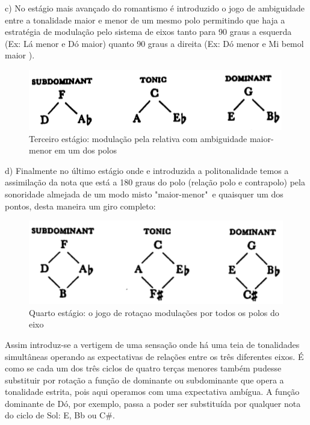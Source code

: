 \documentclass[
	12pt,				%
	openright,			%
	twoside,			%
	a4paper,			%
	english,			%
	french,				%
	spanish,			%
	brazil				%
	]{abntex2}
\begin{document}
c) No estágio mais avançado do romantismo é introduzido o jogo de ambiguidade entre a tonalidade maior e menor de um mesmo polo permitindo que haja a estratégia de modulação pelo sistema de eixos tanto para 90 graus a esquerda (Ex: Lá menor e Dó maior) quanto 90 graus a direita (Ex: Dó menor e Mi bemol maior ).

\begin{figure}[!h]
	\caption{\label{fig_grafico}Terceiro estágio: modulação pela relativa com ambiguidade maior-menor em um dos polos }
	\begin{center}
	    \includegraphics[scale=0.5]{axis/estagio03.png}
	\end{center}
\end{figure}

\pagebreak
d) Finalmente no último estágio onde e introduzida a politonalidade temos a assimilação da nota que está a 180 graus do polo (relação polo e contrapolo) pela sonoridade almejada de um modo misto "maior-menor"\ e quaisquer um dos pontos, desta maneira um giro completo:


\begin{figure}[!h]
	\caption{\label{fig_grafico}Quarto estágio: o jogo de rotaçao modulações por todos os polos do eixo }
	\begin{center}
	    \includegraphics[scale=0.5]{axis/estagio04.png}
	\end{center}
\end{figure}


Assim introduz-se a vertigem de uma sensação onde há uma teia de tonalidades simultâneas operando as expectativas de relações entre os três diferentes eixos. É como se cada um dos três ciclos de quatro terças menores também pudesse substituir por rotação a função de dominante ou subdominante que opera a tonalidade estrita, pois aqui operamos com uma expectativa ambígua. A função dominante de Dó, por exemplo, passa a poder ser substituída por qualquer nota do ciclo de Sol: E, Bb ou C\#.
\end{document}
